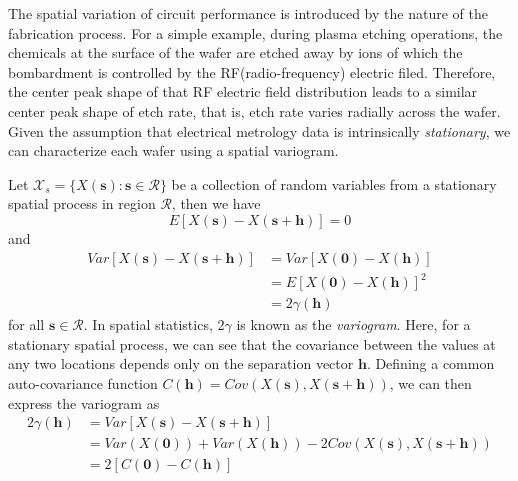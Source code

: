 \documentclass[english]{article}
\numberwithin{equation}{section}
\numberwithin{table}{section}
\numberwithin{figure}{section}
\newcommand{\bms}{\bm{s}}
\newcommand{\bmh}{\bm{h}}
\begin{document}
\hspace{12 pt}
The spatial variation of circuit performance is introduced by the
nature of the fabrication process. For a simple example, during plasma etching
operations, the chemicals at the surface of the wafer are etched away
by ions of which the bombardment is controlled by the
RF(radio-frequency) electric filed. Therefore, 
the center peak shape of that RF electric
field distribution leads to a similar center peak shape of etch rate,
that is, etch rate varies radially across the wafer\cite{dkPHD}. Given
the assumption that electrical metrology data is intrinsically
\emph{stationary}, we can characterize each wafer using a spatial
variogram.


Let $\mathcal{X}_s = \{ X(\bms) : \bms \in \mathcal{R} \}$ be a
collection of random variables from a stationary spatial process in
region $\mathcal{R}$, then we have
\begin{equation} \label{ssmean}
  E[X(\bms) - X(\bms + \bmh)] = 0
\end{equation}
and
\begin{equation} \label{ssvar}
\begin{split}
  Var[X(\bms) - X(\bms + \bmh)] &= Var[X(\bm{0}) - X(\bmh)] \\
  &= E[X(\bm{0}) - X(\bmh)]^2 \\
  &= 2\gamma(\bmh)
\end{split}
\end{equation}
for all $\bms \in \mathcal{R}$. In spatial statistics, $2\gamma$ is
known as the \emph{variogram}. Here, for a stationary spatial process,
we can see that the covariance between the values at any two locations 
depends only on the separation vector $\bmh$. Defining a common
auto-covariance function $C(\bmh) = Cov(X(\bms), X(\bms +
\bmh))$, we can then express the variogram as
\begin{equation} \label{variodef}
\begin{split}
  2\gamma(\bmh) &= Var[X(\bms) - X(\bms + \bmh)] \\
  &= Var(X(\bm{0})) + Var(X(\bmh)) - 2Cov(X(\bms), X(\bms + \bmh)) \\
  &= 2[C(\bm{0}) - C(\bmh)]
\end{split}
\end{equation}
\end{document}
